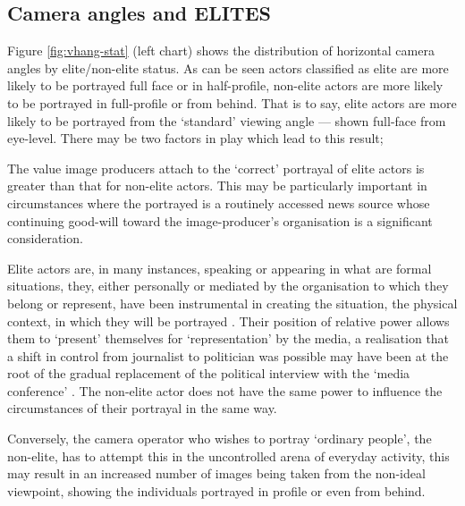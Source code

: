  \subsection{Camera angles and ELITES}\label{senior-control} 
 Figure \ref{fig:vhang-stat} (left chart) shows the distribution of horizontal camera angles by elite/non-elite status. As can be seen actors classified as elite are more likely to be portrayed full face or in half-profile, non-elite actors are more likely to be portrayed in full-profile or from behind. That is to say, elite actors are more likely to be portrayed from the `standard' viewing angle --- shown full-face from eye-level. There may be two factors in play which lead to this result;
\begin{close_descrip}\label{para:pres+status}
\item[Image producer choice] The value image producers attach to the `correct' portrayal of elite actors is greater than that for non-elite actors. This may be particularly important in circumstances where the portrayed is a routinely accessed news source whose continuing good-will toward the image-producer's organisation is a significant consideration.
\item[Subject choice] Elite actors are, in many instances, speaking or appearing in what are formal situations, they, either personally or mediated by the organisation to which they belong or represent,  have been instrumental in creating the situation, the physical context, in which they will be portrayed \citep[9]{Tuchman:1973}. Their position of relative power allows them  to `present' themselves for `representation' by the media, a realisation that a shift in control from journalist to politician was possible may have been at the root of the gradual replacement of the political interview with the `media conference' \citep[29]{Machin:2006}. The non-elite actor does not have the same power to influence the circumstances of their portrayal in the same way.
\end{close_descrip}

Conversely, the camera operator who wishes to portray `ordinary people', the non-elite, has to attempt this in the uncontrolled arena of everyday activity, this may result in an increased number of images being taken from the non-ideal viewpoint, showing the individuals portrayed in profile or even from behind.

